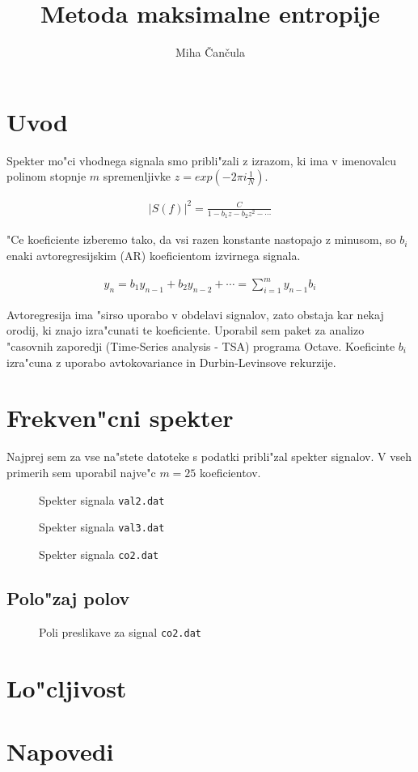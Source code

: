 \documentclass[a4paper,10pt]{article}
\title{Metoda maksimalne entropije}
\author{Miha \v Can\v cula}
\begin{document}
\maketitle

\section{Uvod}

Spekter mo"ci vhodnega signala smo pribli"zali z izrazom, ki ima v imenovalcu polinom stopnje $m$ spremenljivke $z = exp(-2
\pi i \frac{1}{N})$. 

\begin{align}
 |S(f)|^2 = \frac{C}{1 - b_1 z - b_2 z^2 - \cdots}
\end{align}

"Ce koeficiente izberemo tako, da vsi razen konstante nastopajo z minusom, so $b_i$ enaki avtoregresijskim (AR) koeficientom izvirnega signala.

\begin{align}
 y_n = b_1 y_{n-1} + b_2 y_{n-2} + \cdots = \sum_{i=1}^m y_{n-1} b_i
\end{align}

Avtoregresija ima "sirso uporabo v obdelavi signalov, zato obstaja kar nekaj orodij, ki znajo izra"cunati te koeficiente. Uporabil sem paket za analizo "casovnih zaporedji (Time-Series analysis - TSA) programa Octave. Koeficinte $b_i$ izra"cuna z uporabo avtokovariance in Durbin-Levinsove rekurzije. 

\section{Frekven"cni spekter}

Najprej sem za vse na"stete datoteke s podatki pribli"zal spekter signalov. V vseh primerih sem uporabil najve"c $m=25$ koeficientov. 

\begin{figure}[h]
 
 \caption{Spekter signala \texttt{val2.dat}}
 \label{fig:psd-val2}
\end{figure}

\begin{figure}[h]
 
 \caption{Spekter signala \texttt{val3.dat}}
 \label{fig:psd-val3}
\end{figure}

\begin{figure}[h]
 
 \caption{Spekter signala \texttt{co2.dat}}
 \label{fig:psd-co2}
\end{figure}


\subsection{Polo"zaj polov}

\begin{figure}[h]
 
 \caption{Poli preslikave za signal \texttt{co2.dat}}
 \label{fig:roots-co2}
\end{figure}


\section{Lo"cljivost}

\section{Napovedi}

 
\end{document}
